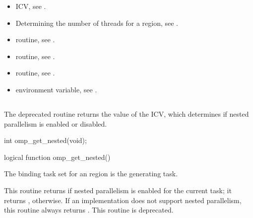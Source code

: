 \crossreferences
\begin{itemize}
\item {} ICV, see 
.

\item Determining the number of threads for a  region, see
. 

\item {} routine, see 
.

\item {} routine, see 
.

\item {} routine, see 
.

\item {} environment variable, see 
.
\end{itemize}








\subsection{}
\label{subsec:omp_get_nested}
\summary
The deprecated  routine returns the value of the  ICV, which 
determines if nested parallelism is enabled or disabled.

\format
\begin{ccppspecific}
\begin{boxedcode}
int omp\_get\_nested(void);
\end{boxedcode}
\end{ccppspecific}

\begin{fortranspecific}
\begin{boxedcode}
logical function omp\_get\_nested()
\end{boxedcode}
\end{fortranspecific}

\binding
The binding task set for an  region is the generating task. 

\effect
This routine returns  if nested parallelism is enabled for the current task; it returns 
, otherwise. If an implementation does not support nested parallelism, this routine 
always returns . This routine is deprecated.

